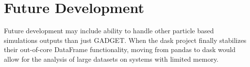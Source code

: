 \section{Future Development}
\label{future}
Future development may include ability to handle other particle based simulations outputs than just GADGET.  When the dask project finally stabilizes their out-of-core DataFrame functionality, moving from pandas to dask would allow for the analysis of large datasets on systems with limited memory.